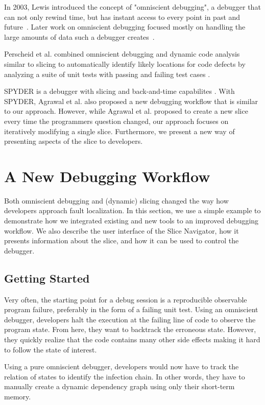 ﻿\documentclass[
      english,
			conference,
      ]{IEEEtran}
\begin{document}
In 2003, Lewis introduced the concept of "omniscient debugging", a debugger that can not only rewind time, but has instant access to every point in past and future~\cite{lewis_debugging_2003}.
Later work on omniscient debugging focused mostly on handling the large amounts of data such a debugger creates~\cite{pothier_scalable_2007, lienhard_practical_2008}.

Perscheid et al. combined omniscient debugging and dynamic code analysis similar to slicing to automatically identify likely locations for code defects by analyzing a suite of unit tests with passing and failing test cases \cite{perscheid_test-driven_2012}.

SPYDER is a debugger with slicing and back-and-time capabilites \cite{agrawal_debugging_1993}.
With SPYDER, Agrawal et al. also proposed a new debugging workflow that is similar to our approach.
However, while Agrawal et al. proposed to create a new slice every time the programmers question changed, our approach focuses on iteratively modifying a single slice.
Furthermore, we present a new way of presenting aspects of the slice to developers.

\section{A New Debugging Workflow}
\label{sec:workflow}

Both omniscient debugging and (dynamic) slicing changed the way how developers approach fault localization.
In this section, we use a simple example to demonstrate how we integrated existing and new tools to an improved debugging workflow.
We also describe the user interface of the Slice Navigator, how it presents information about the slice, and how it can be used to control the debugger.

\subsection{Getting Started}

Very often, the starting point for a debug session is a reproducible observable program failure, preferably in the form of a failing unit test.
Using an omniscient debugger, developers halt the execution at the failing line of code to observe the program state.
From here, they want to backtrack the erroneous state.
However, they quickly realize that the code contains many other side effects making it hard to follow the state of interest.

Using a pure omniscient debugger, developers would now have to track the relation of states to identify the infection chain. 
In other words, they have to manually create a dynamic dependency graph using only their short-term memory.
 
\end{document}
